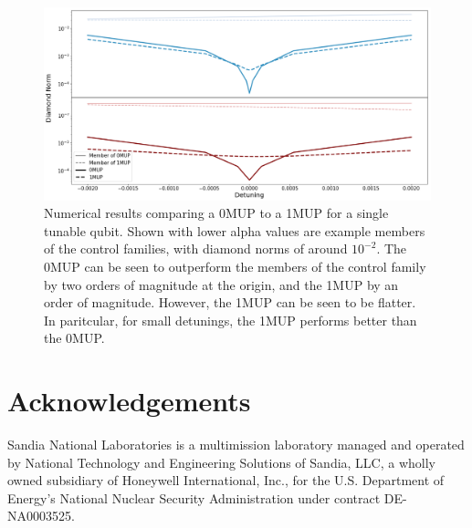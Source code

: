 \documentclass[aps,nofootinbib,pra,notitlepage,twocolumn]{revtex4-1}
\begin{document}
\begin{figure}
  \centering
  \includegraphics[width=\textwidth]{SQRTX.png}
  \caption{Numerical results comparing a 0MUP to a 1MUP for a single tunable qubit. Shown with lower alpha values are example members of the control families, with diamond norms of around $10^{-2}$. The 0MUP can be seen to outperform the members of the control family by two orders of magnitude at the origin, and the 1MUP by an order of magnitude. However, the 1MUP can be seen to be flatter. In paritcular, for small detunings, the 1MUP performs better than the 0MUP.}
  \label{fig:1QMUP}
\end{figure}

\section{Acknowledgements}
\label{sec:acknowledgements}
Sandia National Laboratories is a multimission laboratory managed and operated by National Technology and Engineering Solutions of Sandia, LLC, a wholly owned subsidiary of Honeywell International, Inc., for the U.S. Department of Energy's National Nuclear Security Administration under contract DE-NA0003525.

\end{document}
